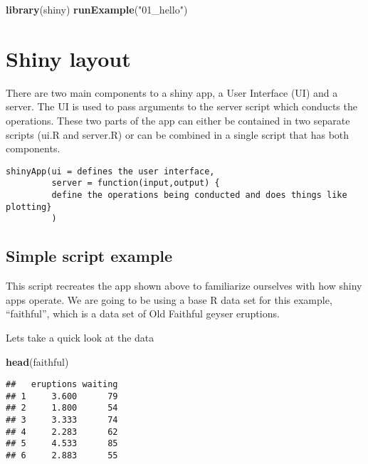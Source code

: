 \documentclass[]{article}
\newenvironment{Shaded}{\begin{snugshade}}{\end{snugshade}}
\newcommand{\KeywordTok}[1]{\textcolor[rgb]{0.13,0.29,0.53}{\textbf{#1}}}
\newcommand{\NormalTok}[1]{#1}
\newcommand{\StringTok}[1]{\textcolor[rgb]{0.31,0.60,0.02}{#1}}
\begin{document}
\begin{Shaded}
\begin{Highlighting}[]
\KeywordTok{library}\NormalTok{(shiny)}
\KeywordTok{runExample}\NormalTok{(}\StringTok{"01_hello"}\NormalTok{)}
\end{Highlighting}
\end{Shaded}

\hypertarget{shiny-layout}{%
\section{Shiny layout}\label{shiny-layout}}

There are two main components to a shiny app, a User Interface (UI) and
a server. The UI is used to pass arguments to the server script which
conducts the operations. These two parts of the app can either be
contained in two separate scripts (ui.R and server.R) or can be combined
in a single script that has both components.

\begin{verbatim}
shinyApp(ui = defines the user interface,
         server = function(input,output) {
         define the operations being conducted and does things like plotting}
         )
\end{verbatim}

\hypertarget{simple-script-example}{%
\subsection{Simple script example}\label{simple-script-example}}

This script recreates the app shown above to familiarize ourselves with
how shiny apps operate. We are going to be using a base R data set for
this example, ``faithful'', which is a data set of Old Faithful geyser
eruptions.

Lets take a quick look at the data

\begin{Shaded}
\begin{Highlighting}[]
\KeywordTok{head}\NormalTok{(faithful)}
\end{Highlighting}
\end{Shaded}

\begin{verbatim}
##   eruptions waiting
## 1     3.600      79
## 2     1.800      54
## 3     3.333      74
## 4     2.283      62
## 5     4.533      85
## 6     2.883      55
\end{verbatim}
\end{document}
